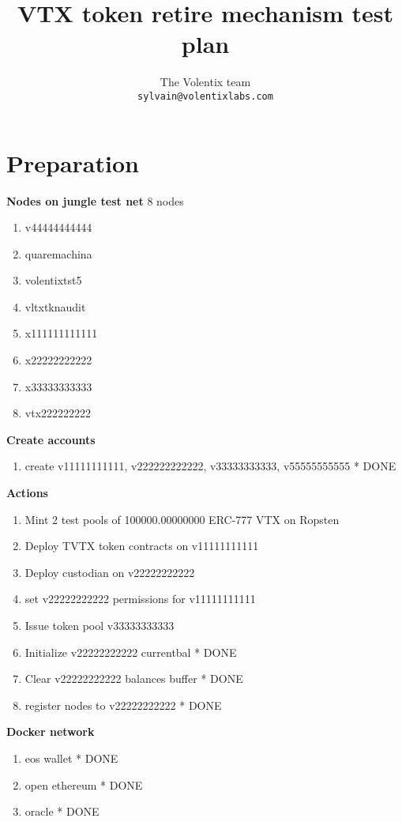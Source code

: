 \documentclass[]{article}
\title{VTX token retire mechanism test plan}
\author{
		The Volentix team\\
	\texttt{sylvain@volentixlabs.com}
}
\begin{document}
\maketitle


\section{Preparation}

\textbf{Nodes on jungle test net}
	8 nodes
	\begin{enumerate}
		\paragraph{}
		\item v44444444444 
		\item quaremachina
		\item volentixtst5
		\item vltxtknaudit
		\item x111111111111
		\item x22222222222
		\item  x33333333333
		\item  vtx222222222				
	  \end{enumerate}
 
\textbf{Create accounts}
\begin{enumerate}	
\item create v11111111111, v222222222222, v33333333333, v55555555555 *	\color{green} DONE

\end{enumerate} 
 \textbf{Actions}
  		\begin{enumerate}
		  \item Mint 2 test pools of  100000.00000000 ERC-777 VTX on Ropsten
		  \item Deploy TVTX token contracts on v11111111111 
		  \item Deploy custodian on v22222222222
		  \item set v22222222222 permissions for v11111111111
		  \item Issue token pool v33333333333
		  \item Initialize v22222222222 currentbal * {\color{green} DONE} 
		  \item Clear v22222222222 balances buffer * {\color{green} DONE} 
 		  \item register nodes to v22222222222 * {\color{green} DONE}
	 \end{enumerate}
   \textbf{Docker network}\\
  \begin{enumerate}
  	\item eos wallet	* {\color{green} DONE}
  	\item open ethereum 	*	 {\color{green} DONE}
  	\item oracle	*  {\color{green} DONE}
  \end{enumerate}
\end{document}
